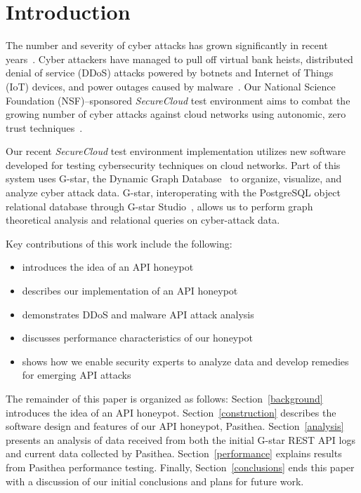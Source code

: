 
\section{Introduction} \label{intro}

The number and severity of cyber attacks has grown significantly in recent years~\cite{Symantec-Threat-Report,IBM-XForce-Report}. 
Cyber attackers have managed to pull off virtual bank heists, distributed denial of service (DDoS) attacks powered by botnets and Internet of Things (IoT) devices, and power outages caused by malware~\cite{IBM-XForce-Report}. 
Our National Science Foundation (NSF)--sponsored {\em SecureCloud} test environment aims to combat the growing number of cyber attacks against cloud networks using autonomic, zero trust techniques~\cite{7796146}.  

Our recent {\em SecureCloud} test environment implementation utilizes new software developed for testing cybersecurity techniques on cloud networks.
Part of this system uses G-star, the Dynamic Graph Database~\cite{Labouseur-DAPD-2015} to organize, visualize, and analyze cyber attack data. 
G-star, interoperating with the PostgreSQL object relational database through G-star Studio~\cite{inroads-Labouseur16}, allows us to perform graph theoretical analysis and relational queries on cyber-attack data.  

Key contributions of this work include the following:
\begin{itemize}
      \setlength{\itemsep}{1pt}
      \setlength{\parskip}{0pt}
      \setlength{\parsep}{0pt}
   \item introduces the idea of an API honeypot
   \item describes our implementation of an API honeypot
   \item demonstrates DDoS and malware API attack analysis
   \item discusses performance characteristics of our honeypot
   \item shows how we enable security experts to analyze data and develop remedies for emerging API attacks  
\end{itemize}

The remainder of this paper is organized as follows: 
Section~\ref{background} introduces the idea of an API honeypot. 
Section~\ref{construction} describes the software design and features of our API honeypot, Pasithea. 
Section~\ref{analysis} presents an analysis of data received from both the initial G-star REST API logs and current data collected by Pasithea. 
Section~\ref{performance} explains results from Pasithea performance testing.
Finally, Section~\ref{conclusions} ends this paper with a discussion of our initial conclusions and plans for future work.
